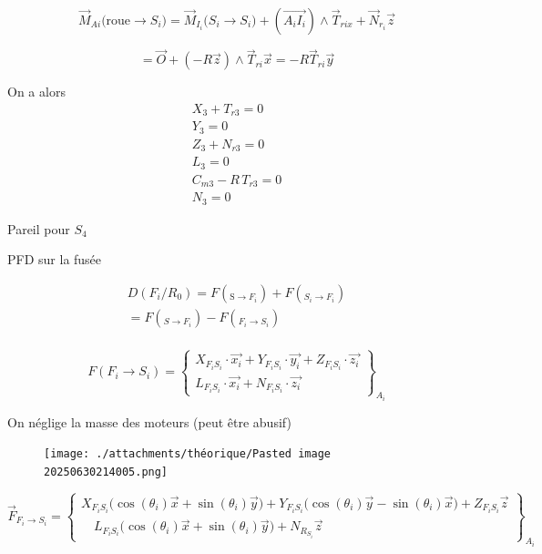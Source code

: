 \documentclass[a4paper,12pt]{report}  %
\begin{document}
$$
\vec{M}_{Ai}({\text{roue} \rightarrow S_i)} = \vec{M}_{I_i}({S_i \rightarrow S_i)} + \left( \overrightarrow{A_iI_i} \right) \wedge \vec{T}_{rix} + \vec{N}_{r_i} \vec{z}
$$

$$ = \vec{O} + ({-R}\vec{z})\wedge\vec{T}_{ri}\vec{x} = -R\vec{T}_{ri}\vec{y}
$$

On a alors
\begin{align*}
	X_3 + T_{r3} = 0  \tag{1}\\
	Y_3 = 0  \tag{2}\\
	Z_3 + N_{r3} = 0  \tag{3}\\
	L_3 = 0  \tag{4}\\
	C_{m3} - R\,T_{r3} = 0  \tag{5}\\
	N_3 = 0 \tag{6}
\end{align*}


Pareil pour $S_4$

PFD sur la fusée


\begin{align*}
	D(F_i/R_0) = {F}(_{\text{S}\rightarrow F_i}) + {F}(_{S_i \rightarrow F_i}) \\
	= {F}(_{S \rightarrow F_i}) - {F}(_{F_i \rightarrow S_i}) \\
\end{align*}






\begin{equation*}
	F(F_i \to S_i) = 
	\begin{Bmatrix}
		X_{F_i S_i} \cdot \vec{x_i} + Y_{F_i S_i} \cdot \vec{y_i} + Z_{F_i S_i} \cdot \vec{z_i} \\
		L_{F_i S_i} \cdot \vec{x_i} + N_{F_i S_i} \cdot \vec{z_i}
	\end{Bmatrix}_{A_{i}}
\end{equation*}



On néglige la masse des moteurs (peut être abusif)


\begin{figure}[H]
	\centering
	\texttt{[image: ./attachments/théorique/Pasted image 20250630214005.png]}
	\caption{}
\end{figure}



\begin{equation*}
	\vec{F}_{F_i \to S_i} =
	\left\{
	\begin{array}{c}
		X_{F_iS_i} \big(\cos(\theta_i) \vec{x} + \sin(\theta_i) \vec{y} \big) 
		
		+  Y_{F_iS_i} \big(\cos(\theta_i) \vec{y} - \sin(\theta_i) \vec{x} \big)
		
		+ Z_{F_iS_i} \vec{z} \\[1em]
		
		\quad L_{F_iS_i} \big(\cos(\theta_i) \vec{x} + \sin(\theta_i) \vec{y} \big)  + N_{R_{S_i}} \vec{z}
		
	\end{array}
	\right\}_{A_i}
\end{equation*}
\end{document}
